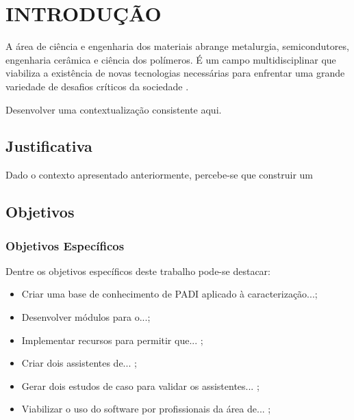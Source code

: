 \chapter{INTRODUÇÃO}
\label{cap:introducao}

A área de ciência e engenharia dos materiais abrange metalurgia, semicondutores, engenharia cerâmica e ciência dos polímeros. É um campo multidisciplinar que viabiliza a existência de novas tecnologias necessárias para enfrentar uma grande variedade de desafios críticos da sociedade \cite{Thornton2009}.


\lipsum[1] %

Desenvolver uma contextualização consistente aqui.

\section{Justificativa}

Dado o contexto apresentado anteriormente, percebe-se que construir um \lipsum[2] %

\lipsum[3] %

\section{Objetivos}

\lipsum[4] %

\subsection{Objetivos Específicos}

Dentre os objetivos específicos deste trabalho pode-se destacar:
\begin{itemize}

\item Criar uma base de conhecimento de PADI aplicado à caracterização...; 

\item Desenvolver módulos para o...;

\item Implementar recursos para permitir que... ;

\item Criar dois assistentes de... ;

\item Gerar dois estudos de caso para validar os assistentes... ;

\item Viabilizar o uso do software por profissionais da área de... ;

\end{itemize}

